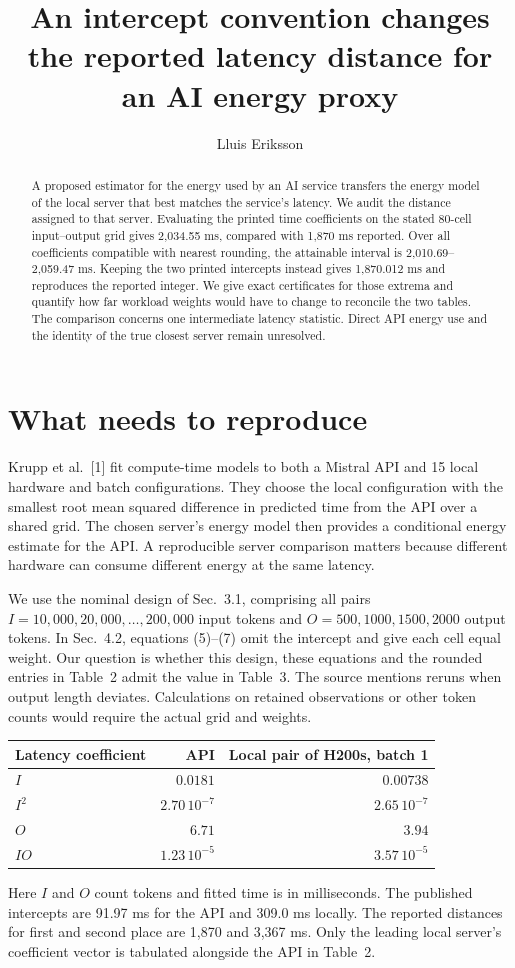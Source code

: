 \documentclass[11pt]{article}
\title{An intercept convention changes the reported latency distance for an AI energy proxy}
\author{Lluis Eriksson}
\date{}
\begin{document}
\maketitle
\begin{abstract}
A proposed estimator for the energy used by an AI service transfers the energy model of the local server that best matches the service's latency. We audit the distance assigned to that server. Evaluating the printed time coefficients on the stated 80-cell input--output grid gives 2,034.55 ms, compared with 1,870 ms reported. Over all coefficients compatible with nearest rounding, the attainable interval is 2,010.69--2,059.47 ms. Keeping the two printed intercepts instead gives 1,870.012 ms and reproduces the reported integer. We give exact certificates for those extrema and quantify how far workload weights would have to change to reconcile the two tables. The comparison concerns one intermediate latency statistic. Direct API energy use and the identity of the true closest server remain unresolved.
\end{abstract}
\section{What needs to reproduce}
Krupp et al.\ [1] fit compute-time models to both a Mistral API and 15 local hardware and batch configurations. They choose the local configuration with the smallest root mean squared difference in predicted time from the API over a shared grid. The chosen server's energy model then provides a conditional energy estimate for the API. A reproducible server comparison matters because different hardware can consume different energy at the same latency.

We use the nominal design of Sec.~3.1, comprising all pairs $I=10{,}000,20{,}000,\ldots,200{,}000$ input tokens and $O=500,1000,1500,2000$ output tokens. In Sec.~4.2, equations (5)--(7) omit the intercept and give each cell equal weight. Our question is whether this design, these equations and the rounded entries in Table~2 admit the value in Table~3. The source mentions reruns when output length deviates. Calculations on retained observations or other token counts would require the actual grid and weights.

\begin{center}
\begin{tabular}{lrr}
\toprule
Latency coefficient & API & Local pair of H200s, batch 1\\
\midrule
$I$ & $0.0181$ & $0.00738$\\
$I^2$ & $2.70\,10^{-7}$ & $2.65\,10^{-7}$\\
$O$ & $6.71$ & $3.94$\\
$IO$ & $1.23\,10^{-5}$ & $3.57\,10^{-5}$\\
\bottomrule
\end{tabular}
\end{center}
Here $I$ and $O$ count tokens and fitted time is in milliseconds. The published intercepts are 91.97 ms for the API and 309.0 ms locally. The reported distances for first and second place are 1,870 and 3,367 ms. Only the leading local server's coefficient vector is tabulated alongside the API in Table~2.
\end{document}
